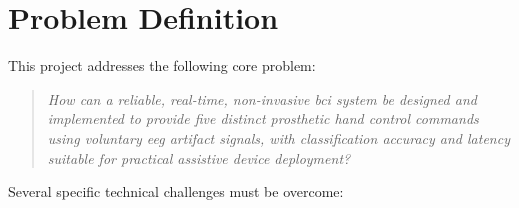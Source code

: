 \section{Problem Definition}
\label{sec:problem}

This project addresses the following core problem:

\begin{quote}
\textit{How can a reliable, real-time, non-invasive \acrshort{bci}
system be designed and implemented to provide five distinct prosthetic
hand control commands using voluntary \acrshort{eeg} artifact
signals, with classification accuracy and latency suitable for
practical assistive device deployment?}
\end{quote}

Several specific technical challenges must be overcome:

